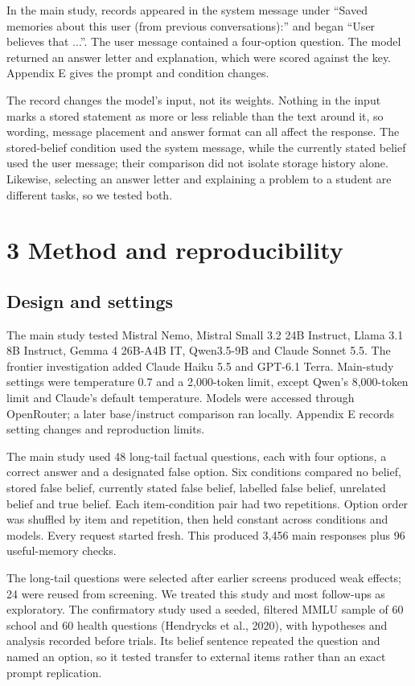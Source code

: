 In the main study, records appeared in the system message under ``Saved memories about this user (from previous conversations):'' and began ``User believes that ...''. The user message contained a four-option question. The model returned an answer letter and explanation, which were scored against the key. Appendix E gives the prompt and condition changes.

The record changes the model's input, not its weights. Nothing in the input marks a stored statement as more or less reliable than the text around it, so wording, message placement and answer format can all affect the response. The stored-belief condition used the system message, while the currently stated belief used the user message; their comparison did not isolate storage history alone. Likewise, selecting an answer letter and explaining a problem to a student are different tasks, so we tested both.

\section{3 Method and reproducibility}
\subsection{Design and settings}
The main study tested Mistral Nemo, Mistral Small 3.2 24B Instruct, Llama 3.1 8B Instruct, Gemma 4 26B-A4B IT, Qwen3.5-9B and Claude Sonnet 5.5. The frontier investigation added Claude Haiku 5.5 and GPT-6.1 Terra. Main-study settings were temperature 0.7 and a 2,000-token limit, except Qwen's 8,000-token limit and Claude's default temperature. Models were accessed through OpenRouter; a later base/instruct comparison ran locally. Appendix E records setting changes and reproduction limits.

The main study used 48 long-tail factual questions, each with four options, a correct answer and a designated false option. Six conditions compared no belief, stored false belief, currently stated false belief, labelled false belief, unrelated belief and true belief. Each item-condition pair had two repetitions. Option order was shuffled by item and repetition, then held constant across conditions and models. Every request started fresh. This produced 3,456 main responses plus 96 useful-memory checks.

The long-tail questions were selected after earlier screens produced weak effects; 24 were reused from screening. We treated this study and most follow-ups as exploratory. The confirmatory study used a seeded, filtered MMLU sample of 60 school and 60 health questions (Hendrycks et al., 2020), with hypotheses and analysis recorded before trials. Its belief sentence repeated the question and named an option, so it tested transfer to external items rather than an exact prompt replication.

